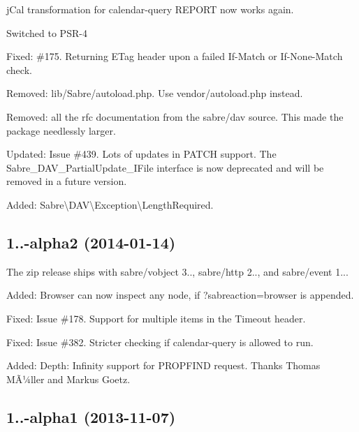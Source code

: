 \begin{DoxyItemize}
\item j\+Cal transformation for calendar-\/query R\+E\+P\+O\+RT now works again.
\item Switched to P\+S\+R-\/4
\item Fixed\+: \#175. Returning E\+Tag header upon a failed {\ttfamily If-\/\+Match} or {\ttfamily If-\/\+None-\/\+Match} check.
\item Removed\+: {\ttfamily lib/\+Sabre/autoload.\+php}. Use {\ttfamily vendor/autoload.\+php} instead.
\item Removed\+: all the rfc documentation from the sabre/dav source. This made the package needlessly larger.
\item Updated\+: Issue \#439. Lots of updates in P\+A\+T\+CH support. The Sabre\+\_\+\+D\+A\+V\+\_\+\+Partial\+Update\+\_\+\+I\+File interface is now deprecated and will be removed in a future version.
\item Added\+: {\ttfamily Sabre\textbackslash{}D\+AV\textbackslash{}Exception\textbackslash{}Length\+Required}.
\end{DoxyItemize}

\subsection*{1..-\/alpha2 (2014-\/01-\/14) }


\begin{DoxyItemize}
\item The zip release ships with sabre/vobject 3.., sabre/http 2.., and sabre/event 1...
\item Added\+: Browser can now inspect any node, if ?sabreaction=browser is appended.
\item Fixed\+: Issue \#178. Support for multiple items in the Timeout header.
\item Fixed\+: Issue \#382. Stricter checking if calendar-\/query is allowed to run.
\item Added\+: Depth\+: Infinity support for P\+R\+O\+P\+F\+I\+ND request. Thanks Thomas MÃ¼ller and Markus Goetz.
\end{DoxyItemize}

\subsection*{1..-\/alpha1 (2013-\/11-\/07) }


